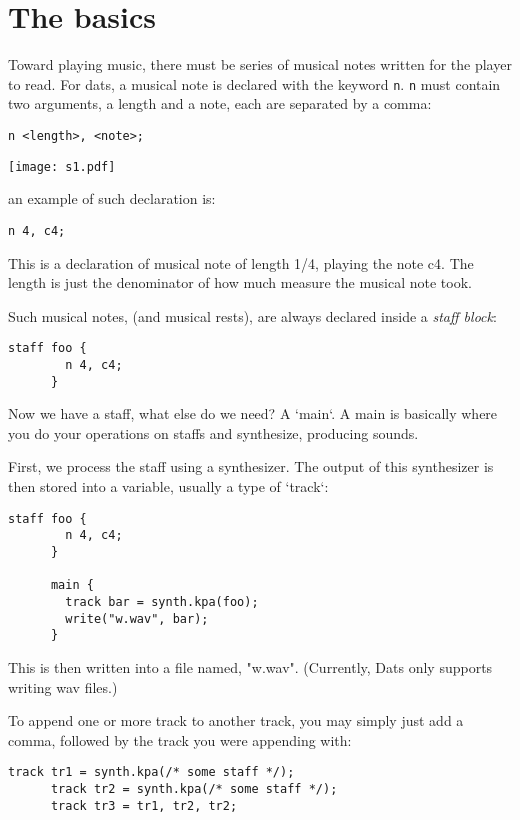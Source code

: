 \section{The basics}

\np Toward playing music, there must be series of musical notes written for the player to read.
For dats, a musical note is declared with the keyword \verb+n+. \verb+n+ must contain two arguments,
a length and a note, each are separated by a comma:


\begin{Verbatim}[frame=single]
       n <length>, <note>;
\end{Verbatim}

\begin{center}
\color{blue}
\texttt{[image: s1.pdf]}
\end{center}

\np an example of such declaration is:
\begin{Verbatim}[frame=single]
       n 4, c4;
\end{Verbatim}

This is a declaration of musical note of length 1/4, playing the note c4. The length
is just the denominator of how much measure the musical note took.

\np Such musical notes, (and musical rests), are always declared inside a \textit{staff block}:

\begin{Verbatim}[frame=single]
      staff foo {
        n 4, c4;
      }
\end{Verbatim}

\np Now we have a staff, what else do we need? A `main`. A main is basically
where you do your operations on staffs and synthesize, producing sounds.

\np First, we process the staff using a synthesizer. The output of this synthesizer
is then stored into a variable, usually a type of `track`:

\begin{Verbatim}[frame=single]
      staff foo {
        n 4, c4;
      }

      main {
        track bar = synth.kpa(foo);
        write("w.wav", bar);
      }
\end{Verbatim}

\np This is then written into a file named, "w.wav". (Currently, Dats only supports writing wav files.)

\np To append one or more track to another track, you may simply just add a comma, followed by the track
you were appending with:

\begin{Verbatim}[frame=single]
      track tr1 = synth.kpa(/* some staff */);
      track tr2 = synth.kpa(/* some staff */);
      track tr3 = tr1, tr2, tr2;
\end{Verbatim}
